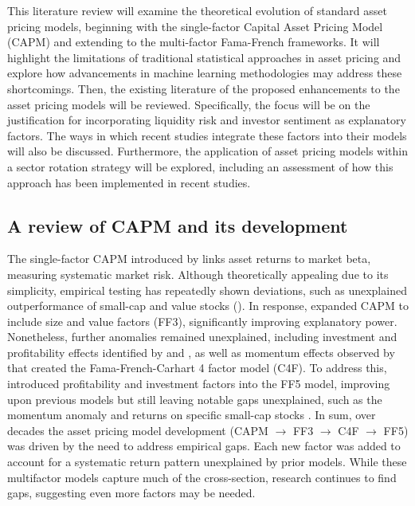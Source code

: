 This literature review will examine the theoretical evolution of standard asset pricing models, beginning with the single-factor Capital Asset Pricing Model (CAPM) and extending to the multi-factor Fama-French frameworks. It will highlight the limitations of traditional statistical approaches in asset pricing and explore how advancements in machine learning methodologies may address these shortcomings. Then, the existing literature of the proposed enhancements to the asset pricing models will be reviewed. Specifically, the focus will be on the justification for incorporating liquidity risk and investor sentiment as explanatory factors. The ways in which recent studies integrate these factors into their models will also be discussed. Furthermore, the application of asset pricing models within a sector rotation strategy will be explored, including an assessment of how this approach has been implemented in recent studies.


\subsection{A review of CAPM and its development}

The single-factor CAPM introduced by  links asset returns to market beta, measuring systematic market risk. Although theoretically appealing due to its simplicity, empirical testing has repeatedly shown deviations, such as unexplained outperformance of small-cap and value stocks (\cite{capm_2004}). In response,  expanded CAPM to include size and value factors (FF3), significantly improving explanatory power. Nonetheless, further anomalies remained unexplained, including investment and profitability effects identified by  and , as well as momentum effects observed by  that created the Fama-French-Carhart 4 factor model (C4F). To address this,  introduced profitability and investment factors into the FF5 model, improving upon previous models but still leaving notable gaps unexplained, such as the momentum anomaly and returns on specific small-cap stocks \cite{sarwarff5,benammar_2018,cakici_2015}. In sum, over decades the asset pricing model development (CAPM $\rightarrow$ FF3 $\rightarrow$ C4F $\rightarrow$ FF5) was driven by the need to address empirical gaps. Each new factor was added to account for a systematic return pattern unexplained by prior models. While these multifactor models capture much of the cross-section, research continues to find gaps, suggesting even more factors may be needed.


